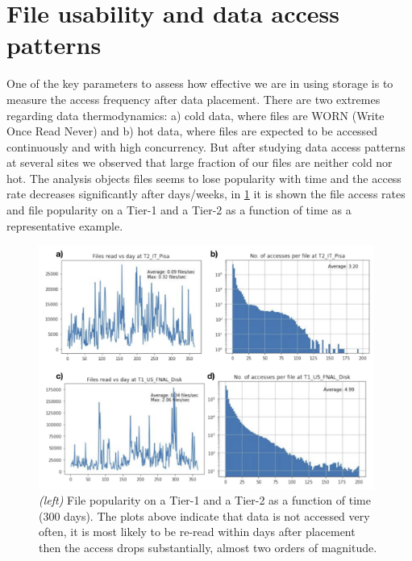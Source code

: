 \section{File usability and data access patterns}
One of the key parameters to assess how effective we are in using storage is to measure the access frequency after data placement. There are two extremes regarding data thermodynamics: a) cold data, where files are WORN (Write Once Read Never) and b) hot data, where files are expected to be accessed continuously and with high concurrency. But after studying data access patterns at several sites we observed that large fraction of our files are neither cold nor hot. The analysis objects files seems to lose popularity with time and the access rate decreases significantly after days/weeks, in \ref{access} it is shown the file access rates and file popularity on a Tier-1 and a Tier-2 as a function of time as a representative example.

\begin{figure}[h]
  \centering
  \includegraphics[height=8cm]{dataaccess-chep2019.png}
  \caption{{\em (left)} File popularity on a Tier-1 and a Tier-2 as a function of time (300 days). The plots above indicate that data is not accessed very often, it is most likely to be re-read within days after placement then the access drops substantially, almost two orders of magnitude.}
  \label{access}
\end{figure}

